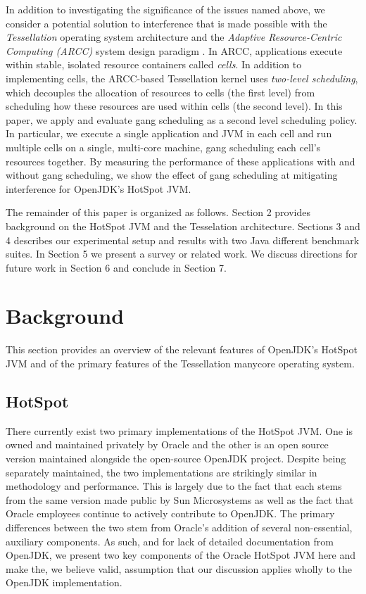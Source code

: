 \documentclass{sig-alternate}
\begin{document}
In addition to investigating the significance of the issues named above, we consider a potential solution to interference that is made possible with the \textit{Tessellation} operating system architecture and the \textit{Adaptive Resource-Centric Computing (ARCC)} system design paradigm \cite{colmenares2010resource, colmenares2013tessellation, liu2009tessellation}. In ARCC, applications execute within stable, isolated resource containers called \textit{cells}. In addition to implementing cells, the ARCC-based Tessellation kernel uses \textit{two-level scheduling}, which decouples the allocation of resources to cells (the first level) from scheduling how these resources are used within cells (the second level). In this paper, we apply and evaluate gang scheduling \cite{feitelson1992gang} as a second level scheduling policy. In particular, we execute a single application and JVM in each cell and run multiple cells on a single, multi-core machine, gang scheduling each cell's resources together. By measuring the performance of these applications with and without gang scheduling, we show the effect of gang scheduling at mitigating interference for OpenJDK's HotSpot JVM.

The remainder of this paper is organized as follows. Section 2 provides background on the HotSpot JVM and the Tesselation architecture. Sections 3 and 4 describes our experimental setup and results with two Java different benchmark suites. In Section 5 we present a survey or related work. We discuss directions for future work in Section 6 and conclude in Section 7.

\section{Background}

This section provides an overview of the relevant features of OpenJDK's HotSpot JVM and of the primary features of the Tessellation manycore operating system.

\subsection{HotSpot}
There currently exist two primary implementations of the HotSpot JVM. One is owned and maintained privately by Oracle and the other is an open source version maintained alongside the open-source OpenJDK project. Despite being separately maintained, the two implementations are strikingly similar in methodology and performance. This is largely due to the fact that each stems from the same version made public by Sun Microsystems as well as the fact that Oracle employees continue to actively contribute to OpenJDK. The primary differences between the two stem from Oracle's addition of several non-essential, auxiliary components. As such, and for lack of detailed documentation from OpenJDK, we present two key components of the Oracle HotSpot JVM here and make the, we believe valid, assumption that our discussion applies wholly to the OpenJDK implementation.
\end{document}
